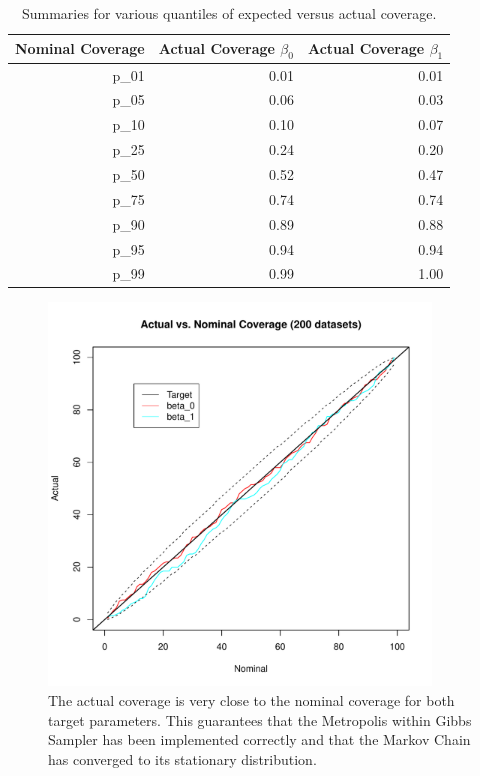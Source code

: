 \documentclass[11pt]{amsart}
\begin{document}
\begin{table}[ht]
\centering
\caption{Summaries for various quantiles of expected versus actual coverage.}
\begin{tabular}{rrr}
  \hline
 Nominal Coverage & Actual Coverage $\beta_0$ & Actual Coverage $\beta_1$ \\ 
  \hline
p\_01 & 0.01 & 0.01 \\ 
  p\_05 & 0.06 & 0.03 \\ 
  p\_10 & 0.10 & 0.07 \\ 
  p\_25 & 0.24 & 0.20 \\ 
  p\_50 & 0.52 & 0.47 \\ 
  p\_75 & 0.74 & 0.74 \\ 
  p\_90 & 0.89 & 0.88 \\ 
  p\_95 & 0.94 & 0.94 \\ 
  p\_99 & 0.99 & 1.00 \\ 
   \hline
\end{tabular}
\end{table}


\begin{figure}[htbp] %
   \centering
   \includegraphics[width=4in]{BayesLogit/coverage_line_plot.pdf} 
   \caption{The actual coverage is very close to the nominal coverage for both target parameters. This guarantees that the Metropolis within Gibbs Sampler has been implemented correctly and that the Markov Chain has converged to its stationary distribution. }
   \label{fig:coverage-q2}
\end{figure}
\end{document}
